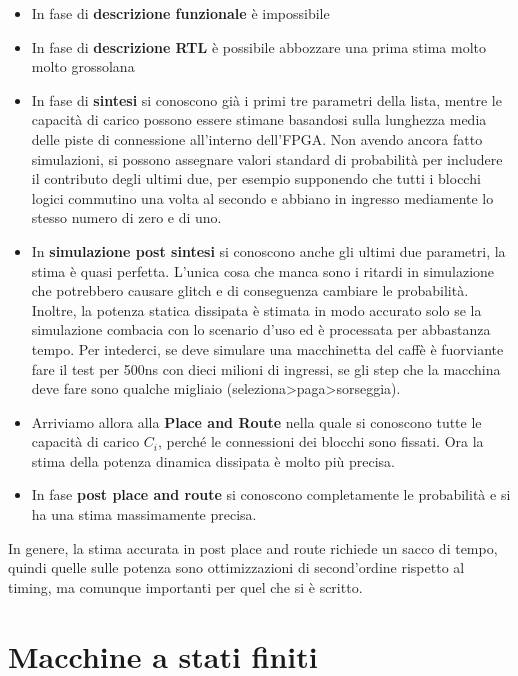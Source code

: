 \documentclass{book}
\begin{document}
        \begin{itemize}
            \item In fase di \textbf{descrizione funzionale} è impossibile
            \item In fase di \textbf{descrizione RTL} è possibile abbozzare una prima stima molto molto grossolana
            \item In fase di \textbf{sintesi} si conoscono già i primi tre parametri della lista, mentre le capacità 
            di carico possono essere stimane basandosi sulla lunghezza media delle piste di connessione all'interno dell'FPGA. Non avendo ancora fatto 
            simulazioni, si possono assegnare valori standard di probabilità per includere il contributo degli ultimi due, per esempio supponendo che tutti i blocchi logici 
            commutino una volta al secondo e abbiano in ingresso mediamente lo stesso numero di zero e di uno.
            \item In \textbf{simulazione post sintesi} si conoscono anche gli ultimi due parametri, la stima è quasi perfetta. L'unica cosa che manca sono i ritardi in simulazione 
            che potrebbero causare glitch e di conseguenza cambiare le probabilità. Inoltre, la potenza statica dissipata
            è stimata in modo accurato solo se la simulazione combacia con lo scenario d'uso ed è processata per abbastanza tempo. Per intederci,
            se deve simulare una macchinetta del caffè è fuorviante fare il test per 500ns con dieci milioni di ingressi, se gli step che la macchina 
            deve fare sono qualche migliaio (seleziona>paga>sorseggia). 
            \item Arriviamo allora alla \textbf{Place and Route} nella quale si conoscono tutte le capacità di carico $C_{i}$,
            perché le connessioni dei blocchi sono fissati. Ora la stima della potenza dinamica dissipata è molto più precisa.
            \item In fase \textbf{post place and route} si conoscono completamente le probabilità e si ha una stima massimamente precisa.
        \end{itemize}
        In genere, la stima accurata in post place and route richiede un sacco di tempo, quindi quelle sulle potenza sono ottimizzazioni
        di second'ordine rispetto al timing, ma comunque importanti per quel che si è scritto.
\chapter{Macchine a stati finiti}
\end{document}

